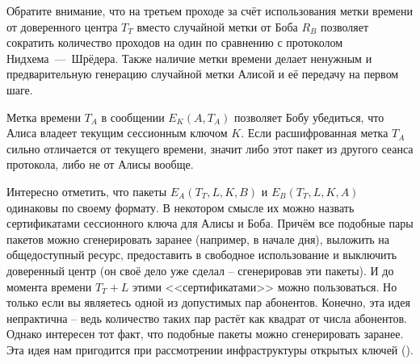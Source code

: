 Обратите внимание, что на третьем проходе за счёт использования метки времени от доверенного центра $T_T$ вместо случайной метки от Боба $R_B$ позволяет сократить количество проходов на один по сравнению с протоколом Нидхема~---~Шрёдера. Также наличие метки времени делает ненужным и предварительную генерацию случайной метки Алисой и её передачу на первом шаге.

Метка времени $T_A$ в сообщении $E_K \left( A, T_A \right)$ позволяет Бобу убедиться, что Алиса владеет текущим сессионным ключом $K$. Если расшифрованная метка $T_A$ сильно отличается от текущего времени, значит либо этот пакет из другого сеанса протокола, либо не от Алисы вообще.

Интересно отметить, что пакеты $E_A \left( T_T, L, K, B \right)$ и $E_B \left( T_T, L, K, A \right)$ одинаковы по своему формату. В некотором смысле их можно назвать сертификатами сессионного ключа для Алисы и Боба. Причём все подобные пары пакетов можно сгенерировать заранее (например, в начале дня), выложить на общедоступный ресурс, предоставить в свободное использование и выключить доверенный центр (он своё дело уже сделал -- сгенерировав эти пакеты). И до момента времени $T_T + L$ этими <<сертификатами>> можно пользоваться. Но только если вы являетесь одной из допустимых пар абонентов. Конечно, эта идея непрактична -- ведь количество таких пар растёт как квадрат от числа абонентов. Однако интересен тот факт, что подобные пакеты можно сгенерировать заранее. Эта идея нам пригодится при рассмотрении инфраструктуры открытых ключей ().

